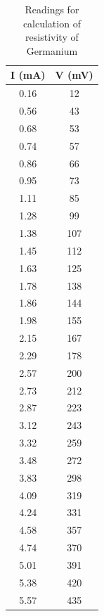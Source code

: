 \documentclass[%
 aip,
 amsmath,amssymb,
 reprint,%
]{revtex4-1}
\begin{document}
\begin{table}[]
\caption{Readings for calculation of resistivity of  Germanium}
\label{tab:getable}
\begin{tabular}{@{}cc@{}}
\toprule
\textbf{I (mA)} & \textbf{V (mV)} \\ \midrule
0.16            & 12              \\
0.56            & 43              \\
0.68            & 53              \\
0.74            & 57              \\
0.86            & 66              \\
0.95            & 73              \\
1.11            & 85              \\
1.28            & 99              \\
1.38            & 107             \\
1.45            & 112             \\
1.63            & 125             \\
1.78            & 138             \\
1.86            & 144             \\
1.98            & 155             \\
2.15            & 167             \\
2.29            & 178             \\
2.57            & 200             \\
2.73            & 212             \\
2.87            & 223             \\
3.12            & 243             \\
3.32            & 259             \\
3.48            & 272             \\
3.83            & 298             \\
4.09            & 319             \\
4.24            & 331             \\
4.58            & 357             \\
4.74            & 370             \\
5.01            & 391             \\
5.38            & 420             \\
5.57            & 435             \\ \bottomrule
\end{tabular}
\end{table}
\end{document}
